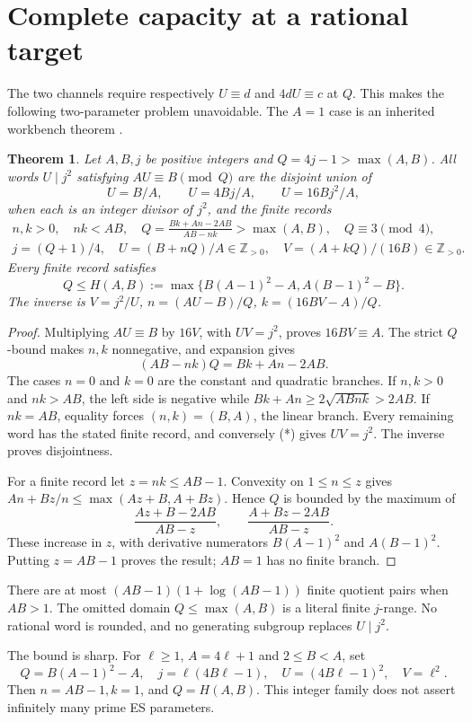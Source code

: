\documentclass[10pt,reqno]{amsart}
\newcommand{\Z}{\mathbb Z}\newcommand{\Q}{\mathbb Q}
\newtheorem{theorem}{Theorem}\newtheorem{lemma}[theorem]{Lemma}
\begin{document}
\section{Complete capacity at a rational target}
The two channels require respectively $U\equiv d$ and $4dU\equiv c$ at $Q$.
This makes the following two-parameter problem unavoidable. The $A=1$ case is
an inherited workbench theorem \cite[eqs. (7)--(12)]{Capacity}.

\begin{theorem}\label{t:capacity}
Let $A,B,j$ be positive integers and $Q=4j-1>\max(A,B)$. All words
$U\mid j^2$ satisfying $AU\equiv B\pmod Q$ are the disjoint union of
\[
 U=B/A,\qquad U=4Bj/A,\qquad U=16Bj^2/A,
\]
when each is an integer divisor of $j^2$, and the finite records
\begin{gather*}
 n,k>0,\quad nk<AB,\quad
 Q=\frac{Bk+An-2AB}{AB-nk}>\max(A,B),\quad Q\equiv3\pmod4,\\
 j=(Q+1)/4,\quad U=(B+nQ)/A\in\Z_{>0},\quad
 V=(A+kQ)/(16B)\in\Z_{>0}.
\end{gather*}
Every finite record satisfies
\[
 \boxed{Q\le H(A,B):=\max\{B(A-1)^2-A,A(B-1)^2-B\}.}
\]
The inverse is $V=j^2/U$, $n=(AU-B)/Q$, $k=(16BV-A)/Q$.
\end{theorem}
\begin{proof}
Multiplying $AU\equiv B$ by $16V$, with $UV=j^2$, proves $16BV\equiv A$.
The strict $Q$-bound makes $n,k$ nonnegative, and expansion gives
\[
 (AB-nk)Q=Bk+An-2AB.\tag{*}
\]
The cases $n=0$ and $k=0$ are the constant and quadratic branches. If $n,k>0$
and $nk>AB$, the left side is negative while
$Bk+An\ge2\sqrt{ABnk}>2AB$. If $nk=AB$, equality forces $(n,k)=(B,A)$,
the linear branch. Every remaining word has the stated finite record, and
conversely (*) gives $UV=j^2$. The inverse proves disjointness.

For a finite record let $z=nk\le AB-1$. Convexity on $1\le n\le z$ gives
$An+Bz/n\le\max(Az+B,A+Bz)$. Hence $Q$ is bounded by the maximum of
\[
 \frac{Az+B-2AB}{AB-z},\qquad\frac{A+Bz-2AB}{AB-z}.
\]
These increase in $z$, with derivative numerators $B(A-1)^2$ and $A(B-1)^2$.
Putting $z=AB-1$ proves the result; $AB=1$ has no finite branch.
\end{proof}
There are at most $(AB-1)(1+\log(AB-1))$ finite quotient pairs when $AB>1$.
The omitted domain $Q\le\max(A,B)$ is a literal finite $j$-range. No rational
word is rounded, and no generating subgroup replaces $U\mid j^2$.

The bound is sharp. For $\ell\ge1$, $A=4\ell+1$ and $2\le B<A$, set
\[
 Q=B(A-1)^2-A,\quad j=\ell(4B\ell-1),\quad
 U=(4B\ell-1)^2,\quad V=\ell^2.
\]
Then $n=AB-1,k=1$, and $Q=H(A,B)$. This integer family does not assert
infinitely many prime ES parameters.
\end{document}
